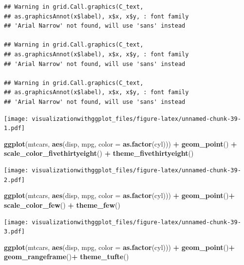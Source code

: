 \documentclass[]{krantz}
\makeatletter
\newenvironment{Shaded}{\begin{snugshade}}{\end{snugshade}}
\newcommand{\DataTypeTok}[1]{\textcolor[rgb]{0.13,0.29,0.53}{#1}}
\newcommand{\KeywordTok}[1]{\textcolor[rgb]{0.13,0.29,0.53}{\textbf{#1}}}
\newcommand{\NormalTok}[1]{#1}
\newcommand{\OperatorTok}[1]{\textcolor[rgb]{0.81,0.36,0.00}{\textbf{#1}}}
\newcommand{\StringTok}[1]{\textcolor[rgb]{0.31,0.60,0.02}{#1}}
\newenvironment{kframe}{%
\medskip{}
\setlength{\fboxsep}{.8em}
 \def\at@end@of@kframe{}%
 \ifinner\ifhmode%
  \def\at@end@of@kframe{\end{minipage}}%
  \begin{minipage}{\columnwidth}%
 \fi\fi%
 \def\FrameCommand##1{\hskip\@totalleftmargin \hskip-\fboxsep
 \colorbox{shadecolor}{##1}\hskip-\fboxsep
     \hskip-\linewidth \hskip-\@totalleftmargin \hskip\columnwidth}%
 \MakeFramed {\advance\hsize-\width
   \@totalleftmargin\z@ \linewidth\hsize
   \@setminipage}}%
 {\par\unskip\endMakeFramed%
 \at@end@of@kframe}
\renewenvironment{Shaded}{\begin{kframe}}{\end{kframe}}
\makeatother
\begin{document}
\begin{verbatim}
## Warning in grid.Call.graphics(C_text,
## as.graphicsAnnot(x$label), x$x, x$y, : font family
## 'Arial Narrow' not found, will use 'sans' instead

## Warning in grid.Call.graphics(C_text,
## as.graphicsAnnot(x$label), x$x, x$y, : font family
## 'Arial Narrow' not found, will use 'sans' instead

## Warning in grid.Call.graphics(C_text,
## as.graphicsAnnot(x$label), x$x, x$y, : font family
## 'Arial Narrow' not found, will use 'sans' instead
\end{verbatim}

\texttt{[image: visualizationwithggplot\_files/figure-latex/unnamed-chunk-39-1.pdf]}

\begin{Shaded}
\begin{Highlighting}[]
\KeywordTok{ggplot}\NormalTok{(mtcars, }\KeywordTok{aes}\NormalTok{(disp, mpg, }\DataTypeTok{color =} \KeywordTok{as.factor}\NormalTok{(cyl))) }\OperatorTok{+}\StringTok{ }
\StringTok{  }\KeywordTok{geom_point}\NormalTok{() }\OperatorTok{+}\StringTok{ }
\StringTok{  }\KeywordTok{scale_color_fivethirtyeight}\NormalTok{() }\OperatorTok{+}
\StringTok{    }\KeywordTok{theme_fivethirtyeight}\NormalTok{()}
\end{Highlighting}
\end{Shaded}

\texttt{[image: visualizationwithggplot\_files/figure-latex/unnamed-chunk-39-2.pdf]}

\begin{Shaded}
\begin{Highlighting}[]
\KeywordTok{ggplot}\NormalTok{(mtcars, }\KeywordTok{aes}\NormalTok{(disp, mpg, }\DataTypeTok{color =} \KeywordTok{as.factor}\NormalTok{(cyl))) }\OperatorTok{+}\StringTok{ }
\StringTok{  }\KeywordTok{geom_point}\NormalTok{()}\OperatorTok{+}\StringTok{     }
\StringTok{  }\KeywordTok{scale_color_few}\NormalTok{() }\OperatorTok{+}
\StringTok{    }\KeywordTok{theme_few}\NormalTok{()}
\end{Highlighting}
\end{Shaded}

\texttt{[image: visualizationwithggplot\_files/figure-latex/unnamed-chunk-39-3.pdf]}

\begin{Shaded}
\begin{Highlighting}[]
\KeywordTok{ggplot}\NormalTok{(mtcars, }\KeywordTok{aes}\NormalTok{(disp, mpg, }\DataTypeTok{color =} \KeywordTok{as.factor}\NormalTok{(cyl))) }\OperatorTok{+}\StringTok{    }
\StringTok{  }\KeywordTok{geom_point}\NormalTok{()}\OperatorTok{+}\StringTok{ }
\StringTok{    }\KeywordTok{geom_rangeframe}\NormalTok{()}\OperatorTok{+}\StringTok{ }
\StringTok{    }\KeywordTok{theme_tufte}\NormalTok{()}
\end{Highlighting}
\end{Shaded}
\end{document}
